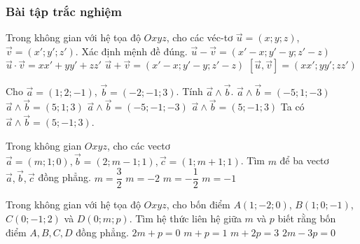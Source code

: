 \subsubsection{Bài tập trắc nghiệm}
\begin{ex}%
	Trong không gian với hệ tọa độ $Oxyz$, cho các véc-tơ $\overrightarrow{u}=(x;y;z)$, $\overrightarrow{v}=(x';y';z')$. Xác định mệnh đề đúng.
	\choice
	{$\overrightarrow{u}-\overrightarrow{v}=(x'-x;y'-y;z'-z)$}
	{\True $\overrightarrow{u}\cdot\overrightarrow{v}=xx'+yy'+zz'$}
	{$\overrightarrow{u}+\overrightarrow{v}=(x'-x;y'-y;z'-z)$}
	{$\left[\overrightarrow{u},\overrightarrow{v}\right]=(xx';yy';zz')$}
\end{ex}
\begin{ex}%
	Cho $\vec{a}=(1;2;-1)$, $\vec{b}=(-2;-1;3)$. Tính $\vec{a}\wedge\vec{b}$.
	\choice
	{$\vec{a}\wedge\vec{b}=(-5;1;-3)$}
	{$\vec{a}\wedge\vec{b}=(5;1;3)$}
	{$\vec{a}\wedge\vec{b}=(-5;-1;-3)$}
	{\True $\vec{a}\wedge\vec{b}=(5;-1;3)$}
	\loigiai
	{
		Ta có $\vec{a}\wedge\vec{b}=(5;-1;3)$.
	}
\end{ex}
\begin{ex}%
	Trong không gian $Oxyz$, cho các vectơ $\overrightarrow a=(m;1;0),\overrightarrow b=(2;m-1;1),\overrightarrow{c}=(1;m+1;1)$. Tìm $m$ để ba vectơ $\overrightarrow a ,\overrightarrow b ,\overrightarrow c$ đồng phẳng.
	\choice
	{$m=\dfrac{3}{2}$}
	{$m=-2$}
	{\True $m=-\dfrac{1}{2}$}
	{$m=-1$}
\end{ex}
\begin{ex}%
	Trong không gian với hệ tọa độ $Oxyz$, cho bốn điểm $A(1;-2;0)$, $B(1;0;-1)$, $C(0;-1;2)$ và $D(0;m;p)$. Tìm hệ thức liên hệ giữa $m$ và $p$ biết rằng bốn điểm $A,B,C,D$ đồng phẳng.
	\choice
	{$2m+p=0$}
	{$m+p=1$}
	{\True $m+2p=3$}
	{$2m-3p=0$} 
\end{ex}

